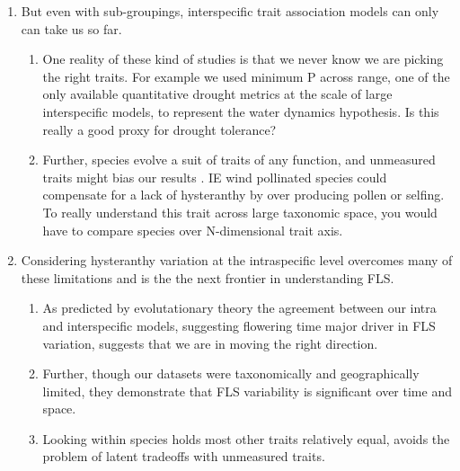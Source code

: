 \documentclass[12pt]{article}\usepackage[]{graphicx}\usepackage[]{color}
\begin{document}
\begin{enumerate}
\item But even with sub-groupings, interspecific trait association models can only can take us so far. 
\begin{enumerate}

\item One reality of these kind of studies is that we never know we are picking the right traits. For example we used minimum P across range, one of the only available quantitative drought metrics at the scale of large interspecific models, to represent the water dynamics hypothesis. Is this really a good proxy for drought tolerance?
\item Further, species evolve a suit of traits of any function, and unmeasured traits might bias our results \citep{Davies2019}. IE wind pollinated species could compensate for a lack of hysteranthy by over producing pollen or selfing. To really understand this trait across large taxonomic space, you would have to compare species over N-dimensional trait axis.
\end{enumerate}

\item Considering hysteranthy variation at the intraspecific level overcomes many of these limitations and is the the next frontier in understanding FLS.
\begin{enumerate}
\item As predicted by evolutationary theory the agreement between our intra and interspecific models, suggesting flowering time major driver in FLS variation, suggests that we are in moving the right direction.
\item Further, though our datasets were taxonomically and geographically limited, they demonstrate that FLS variability is significant over time and space.
\item Looking within species holds most other traits relatively equal, avoids the problem of latent tradeoffs with unmeasured traits.
\end{enumerate}


\end{enumerate}
\end{document}
